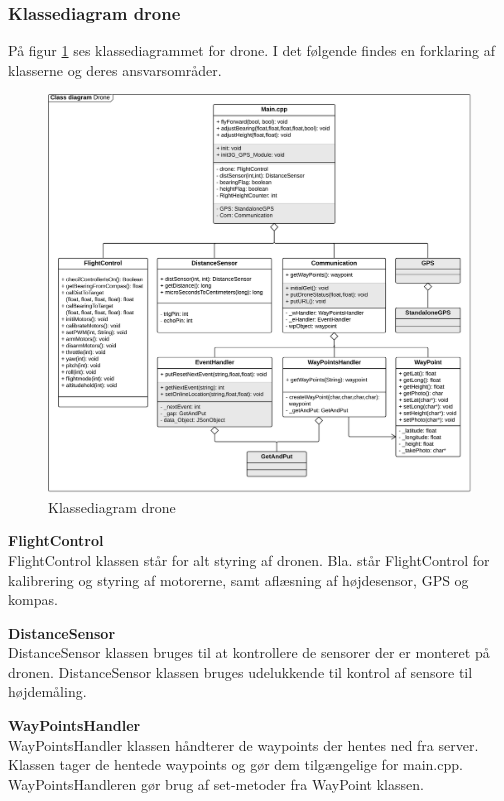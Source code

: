 \newpage
\subsubsection*{Klassediagram drone}

På figur \ref{fig:classDiagram_drone_underflyvning} ses klassediagrammet for drone. I det følgende findes en forklaring af klasserne og deres ansvarsområder. 

\begin{figure}[H]
	\centering
	\includegraphics[width=1\textwidth]{Billeder/klasse_diagrammer/classdiagram_iteration2_drone.png}
	\vspace{-0.7cm}
	\caption{Klassediagram drone}
	\label{fig:classDiagram_drone_underflyvning}
\end{figure}

\textbf{FlightControl} \\
FlightControl klassen står for alt styring af dronen. Bla. står FlightControl for kalibrering og styring af motorerne, samt aflæsning af højdesensor, GPS og kompas. 

\textbf{DistanceSensor} \\
DistanceSensor klassen bruges til at kontrollere de sensorer der er monteret på dronen. DistanceSensor klassen bruges udelukkende til kontrol af sensore til højdemåling. 

\textbf{WayPointsHandler} \\
WayPointsHandler klassen håndterer de waypoints der hentes ned fra server. Klassen tager de hentede waypoints og gør dem tilgængelige for main.cpp. WayPointsHandleren gør brug af set-metoder fra WayPoint klassen.

